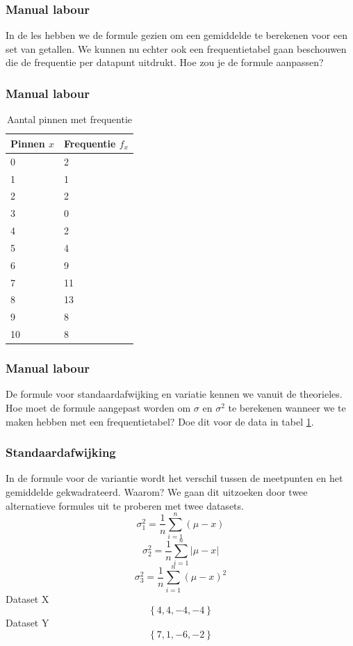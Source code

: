 \documentclass{beamer}
\begin{document}
\fi 

\begin{frame}
	\frametitle{Manual labour}
	In de les hebben we de formule gezien om een gemiddelde
	te berekenen voor een set van getallen. We kunnen nu echter
	ook een frequentietabel gaan beschouwen die de frequentie per
	datapunt uitdrukt. Hoe zou je de formule aanpassen?
	
\end{frame}

\begin{frame}
	\frametitle{Manual labour}
	\begin{table}[]
\centering
\caption{Aantal pinnen met frequentie}
\label{tab:pinfreq}
\begin{tabular}{@{}ll@{}}
\toprule
Pinnen $x$ & Frequentie $f_{x}$ \\ \midrule
0          & 2                  \\
1          & 1                  \\
2          & 2                  \\
3          & 0                  \\
4          & 2                  \\
5          & 4                  \\
6          & 9                  \\
7          & 11                 \\
8          & 13                 \\
9          & 8                  \\ \midrule
10         & 8                  \\ \bottomrule
\end{tabular}
\end{table}
\end{frame}


\begin{frame}
	\frametitle{Manual labour}
	De formule voor standaardafwijking en variatie kennen we vanuit de theorieles. 
	Hoe moet de formule aangepast worden om $\sigma$ en $\sigma^{2}$ te berekenen wanneer we te
	maken hebben met een frequentietabel? Doe dit voor de data in tabel \ref{tab:pinfreq}.
\end{frame}

\begin{frame}
	\frametitle{Standaardafwijking}
	In de formule voor de variantie  wordt het
	verschil tussen de meetpunten en het gemiddelde gekwadrateerd.
	Waarom? We gaan dit uitzoeken door twee alternatieve formules uit
	te proberen met twee datasets.
	\[ \sigma^{2}_{1} = \frac{1}{n} \sum_{i=1}^{n} (\mu - x) \]
	\[ \sigma^{2}_{2} = \frac{1}{n} \sum_{i=1}^{n} \left| \mu - x\right| \]
	\[ \sigma^{2}_{3} = \frac{1}{n} \sum_{i=1}^{n} (\mu - x)^{2} \]
	Dataset X \[ \left\{ 4,4,-4,-4 \right\} \]
	Dataset Y \[ \left\{ 7,1,-6,-2 \right\} \]
\end{frame}
\end{document}
